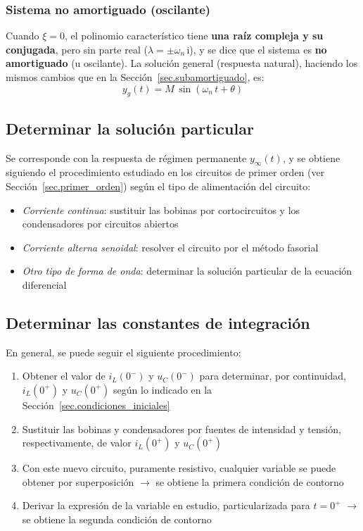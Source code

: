 \documentclass[11pt]{book} %
\begin{document}
	\subsubsection{Sistema no amortiguado (oscilante)}
	Cuando $\xi=0$, el polinomio característico tiene \textbf{una raíz compleja y su conjugada}, pero sin parte real ($\lambda=\pm \omega_n\,\mathrm{i}$), y se dice que el sistema es \textbf{no amortiguado} (u oscilante). La solución general (respuesta natural), haciendo los mismos cambios que en la Sección~\ref{sec.subamortiguado}, es:
	\begin{equation*}
	 y_g(t)=M\,\sin\left(\omega_n\,t + \theta \right)
	\end{equation*}
	
	\subsection{Determinar la solución particular}
	Se corresponde con la respuesta de régimen permanente $y_\infty(t)$, y se obtiene siguiendo el procedimiento estudiado en los circuitos de primer orden (ver Sección~\ref{sec.primer_orden}) según el tipo de alimentación del circuito:
	\begin{itemize}
	        \item \textit{Corriente continua}: sustituir las bobinas por cortocircuitos y los condensadores por circuitos abiertos
	        \item \textit{Corriente alterna senoidal}: resolver el circuito por el método fasorial
	        \item \textit{Otro tipo de forma de onda}: determinar la solución particular de la ecuación diferencial
	    \end{itemize}
	
	\subsection{Determinar las constantes de integración}
	En general, se puede seguir el siguiente procedimiento:
	\begin{enumerate}
	    \item Obtener el valor de $i_L(0^-)$ y $u_C(0^-)$ para determinar, por continuidad, $i_L(0^+)$ y $u_C(0^+)$ según lo indicado en la Sección~\ref{sec.condiciones_iniciales}
	    \item Sustituir las bobinas y condensadores por fuentes de intensidad y tensión, respectivamente, de valor $i_L(0^+)$ y $u_C(0^+)$
	    \item Con este nuevo circuito, puramente resistivo, cualquier variable se puede obtener por superposición $\rightarrow$ se obtiene la primera condición de contorno
	    \item Derivar la expresión de la variable en estudio, particularizada para $t=0^+$ $\rightarrow$ se obtiene la segunda condición de contorno
	\end{enumerate}
	
\end{document}
